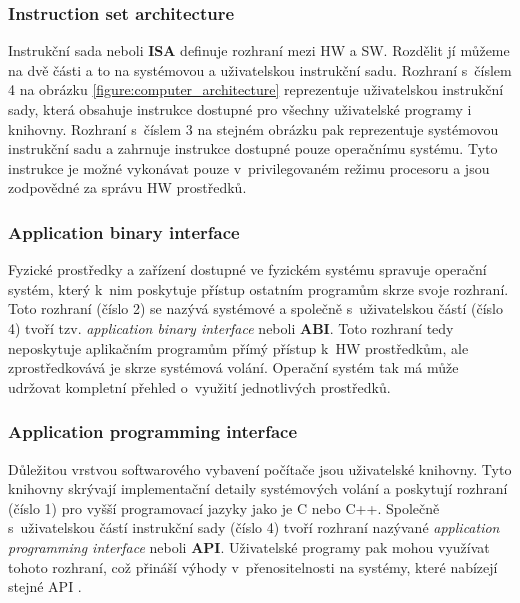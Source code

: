 \subsubsection{Instruction set architecture}
\label{chapter:virtualization:virtual_machine:computer_architecture:isa}
Instrukční sada neboli \textbf{ISA} definuje rozhraní mezi HW a SW. Rozdělit jí můžeme na dvě části a to na systémovou a
uživatelskou instrukční sadu. Rozhraní s~číslem 4 na obrázku \ref{figure:computer_architecture} reprezentuje uživatelskou
instrukční sady, která obsahuje instrukce dostupné pro všechny uživatelské programy i knihovny. Rozhraní s~číslem 3 na stejném
obrázku pak reprezentuje systémovou instrukční sadu a zahrnuje instrukce dostupné pouze operačnímu systému. Tyto instrukce je
možné vykonávat pouze v~privilegovaném režimu procesoru a jsou zodpovědné za správu HW prostředků.
\subsubsection{Application binary interface}
\label{chapter:virtualization:virtual_machine:computer_architecture:abi}
Fyzické prostředky a zařízení dostupné ve fyzickém systému spravuje operační systém, který k~nim poskytuje přístup ostatním
programům skrze svoje rozhraní. Toto rozhraní (číslo 2) se nazývá systémové a společně s~uživatelskou částí (číslo 4) tvoří
tzv. \textit{application binary interface} neboli \textbf{ABI}. Toto rozhraní tedy neposkytuje aplikačním programům přímý
přístup k~HW prostředkům, ale zprostředkovává je skrze systémová volání. Operační systém tak má může udržovat kompletní přehled
o~využití jednotlivých prostředků.
\subsubsection{Application programming interface}
\label{chapter:virtualization:virtual_machine:computer_architecture:api}
Důležitou vrstvou softwarového vybavení počítače jsou uživatelské knihovny. Tyto knihovny skrývají implementační detaily
systémových volání a poskytují rozhraní (číslo 1) pro vyšší programovací jazyky jako je C nebo C++. Společně s~uživatelskou
částí instrukční sady (číslo 4) tvoří rozhraní nazývané \textit{application programming interface} neboli \textbf{API}.
Uživatelské programy pak mohou využívat tohoto rozhraní, což přináší výhody v~přenositelnosti na systémy, které nabízejí
stejné API .
